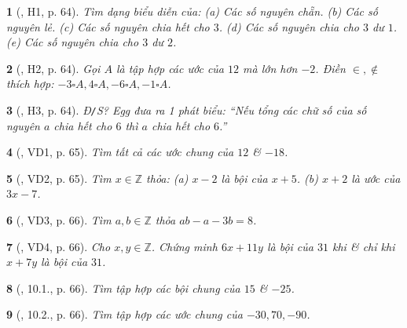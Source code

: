 \documentclass{article}
\newtheorem{baitoan}{}
\begin{document}
\begin{baitoan}[\cite{Binh_boi_duong_Toan_6_tap_1}, H1, p. 64]
	Tìm dạng biểu diễn của: (a) Các số nguyên chẵn. (b) Các số nguyên lẻ. (c) Các số nguyên chia hết cho $3$. (d) Các số nguyên chia cho $3$ dư $1$. (e) Các số nguyên chia cho $3$ dư $2$.
\end{baitoan}

\begin{baitoan}[\cite{Binh_boi_duong_Toan_6_tap_1}, H2, p. 64]
	Gọi $A$ là tập hợp các ước của $12$ mà lớn hơn $-2$. Điền $\in,\notin$ thích hợp: $-3\square A,4\square A,-6\square A,-1\square A$.
\end{baitoan}

\begin{baitoan}[\cite{Binh_boi_duong_Toan_6_tap_1}, H3, p. 64]
	{\rm Đ{\tt/}S?} Egg đưa ra 1 phát biểu: ``Nếu tổng các chữ số của số nguyên $a$ chia hết cho $6$ thì $a$ chia hết cho $6$.''
\end{baitoan}

\begin{baitoan}[\cite{Binh_boi_duong_Toan_6_tap_1}, VD1, p. 65]
	Tìm tất cả các ước chung của $12$ \& $-18$.
\end{baitoan}

\begin{baitoan}[\cite{Binh_boi_duong_Toan_6_tap_1}, VD2, p. 65]
	Tìm $x\in\mathbb{Z}$ thỏa: (a) $x - 2$ là bội của $x + 5$. (b) $x + 2$ là ước của $3x - 7$.
\end{baitoan}

\begin{baitoan}[\cite{Binh_boi_duong_Toan_6_tap_1}, VD3, p. 66]
	Tìm $a,b\in\mathbb{Z}$ thỏa $ab - a - 3b = 8$.
\end{baitoan}

\begin{baitoan}[\cite{Binh_boi_duong_Toan_6_tap_1}, VD4, p. 66]
	Cho $x,y\in\mathbb{Z}$. Chứng minh $6x + 11y$ là bội của $31$ khi \& chỉ khi $x + 7y$ là bội của $31$.
\end{baitoan}

\begin{baitoan}[\cite{Binh_boi_duong_Toan_6_tap_1}, 10.1., p. 66]
	Tìm tập hợp các bội chung của $15$ \& $-25$.
\end{baitoan}

\begin{baitoan}[\cite{Binh_boi_duong_Toan_6_tap_1}, 10.2., p. 66]
	Tìm tập hợp các ước chung của $-30,70,-90$.
\end{baitoan}
\end{document}
